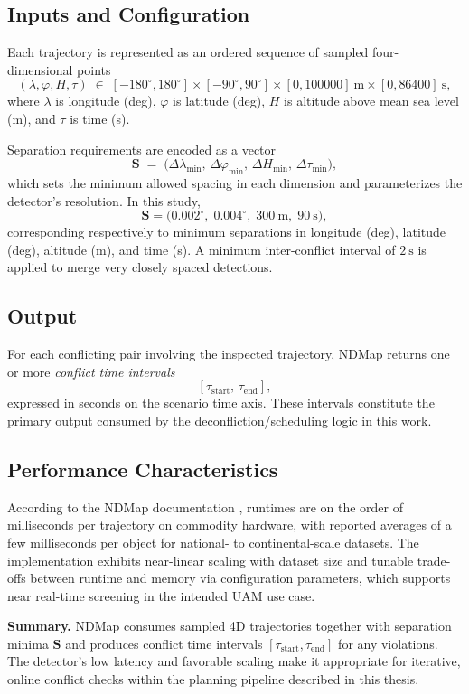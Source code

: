 \subsection*{Inputs and Configuration}
Each trajectory is represented as an ordered sequence of sampled four-dimensional points
\[
(\lambda,\varphi,H,\tau)
\;\in\;
[-180^\circ,180^\circ] \times [-90^\circ,90^\circ] \times [0,100000]~\text{m} \times [0,86400]~\text{s},
\]
where  
$\lambda$ is longitude (deg),  
$\varphi$ is latitude (deg),  
$H$ is altitude above mean sea level (m), and  
$\tau$ is time (s).

Separation requirements are encoded as a vector
\begin{equation}
  \mathbf{S} \;=\; 
  \bigl(\Delta\lambda_{\min},\,\Delta\varphi_{\min},\,\Delta H_{\min},\,\Delta\tau_{\min}\bigr),
\end{equation}
which sets the minimum allowed spacing in each dimension and parameterizes the detector’s resolution.  
In this study,
\[
\mathbf{S} = 
\bigl(0.002^\circ,\;0.004^\circ,\;300~\text{m},\;90~\text{s}\bigr),
\]
corresponding respectively to minimum separations in longitude (deg), latitude (deg), altitude (m), and time (s).  
A minimum inter-conflict interval of \(2~\text{s}\) is applied to merge very closely spaced detections.

\subsection*{Output}
For each conflicting pair involving the inspected trajectory, NDMap returns one or more
\emph{conflict time intervals}
\[
[\tau_{\text{start}},\,\tau_{\text{end}}],
\]
expressed in seconds on the scenario time axis. These intervals constitute the primary output consumed
by the deconfliction/scheduling logic in this work.

\subsection*{Performance Characteristics}
According to the NDMap documentation \cite{NDMap}, runtimes are on the order of
milliseconds per trajectory on commodity hardware, with reported averages of a few milliseconds per
object for national- to continental-scale datasets. The implementation exhibits near-linear scaling
with dataset size and tunable trade-offs between runtime and memory via configuration parameters, which
supports near real-time screening in the intended UAM use case.

\medskip
\noindent\textbf{Summary.}
NDMap consumes sampled 4D trajectories together with separation minima \(\mathbf{S}\) and produces
conflict time intervals \([\tau_{\text{start}},\tau_{\text{end}}]\) for any violations. The detector’s
low latency and favorable scaling make it appropriate for iterative, online conflict checks within
the planning pipeline described in this thesis.

